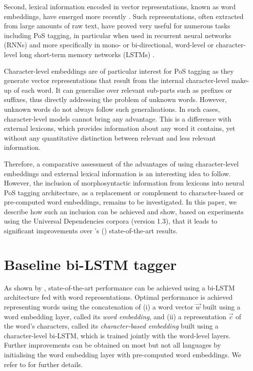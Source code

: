 \documentclass[11pt,a4paper]{article}
\newcommand\hm[1]{\textcolor{blue}{#1}}
\begin{document}
Second, lexical information encoded in vector representations, known as word embeddings, have emerged more
recently \cite{bengio03,collobert08,chrupala13,ling15,ballesteros15,muller15}. Such representations, often
extracted from large amounts of raw text, have proved very useful for numerous tasks including PoS tagging, in
particular when used in recurrent neural networks (RNNs) and more specifically in mono- or bi-directional, word-level or
character-level long short-term memory networks (LSTMs) \cite{hochreiter97,ling15,ballesteros15,plank16}.

Character-level embeddings are of particular interest for PoS tagging as they generate vector representations that
result from the internal character-level make-up of each word. It can generalise over relevant sub-parts such as
prefixes or suffixes, thus directly addressing the problem of unknown words. However, unknown words do not always follow
such generalisations. In such cases, character-level models cannot bring any advantage. This is a difference with
external lexicons, which provides information about any word it contains, yet without any quantitative distinction
between relevant and less relevant information.

Therefore, a comparative assessment of the advantages of using character-level embeddings and external lexical
information is an interesting idea to follow. However, the inclusion of morphosyntactic information from lexicons into
neural PoS tagging architecture, as a replacement or complement to character-based or pre-computed word embeddings,
remains to be investigated. In this paper, we describe how such an inclusion can be achieved and show, based on
experiments using the Universal Dependencies corpora (version 1.3), that it leads to significant improvements over
\citeauthor{plank16}'s (\citeyear{plank16}) state-of-the-art results.


\section{Baseline bi-LSTM tagger}
\label{sec:baselinearchitecture}
As shown by \citet{plank16}, state-of-the-art performance can be achieved using a bi-LSTM architecture fed with word
representations. Optimal performance is achieved representing words using the concatenation of (i) a word vector
$\vec{w}$ built using a word embedding layer, called its {\em word embedding}, and (ii) a representation $\vec{c}$ of
the word's characters, called its {\em character-based embedding} built using a character-level bi-LSTM, which is
trained jointly with the word-level layers. Further improvements can be obtained on most but not all languages by
initialising the word embedding layer with pre-computed word embeddings. We refer to \citet{plank16} for further details.
\end{document}
